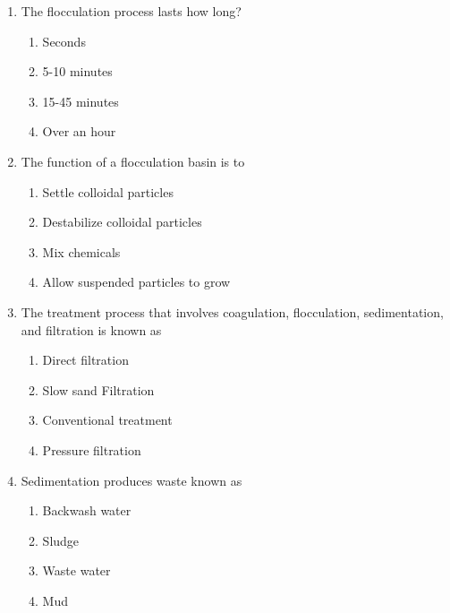 \begin{enumerate}
\item  The flocculation process lasts how long?\\
\begin{enumerate}
\item Seconds\\
\item 5-10 minutes\\
\item 15-45 minutes\\
\item Over an hour
\end{enumerate}

\item  The function of a flocculation basin is to\\
\begin{enumerate}
\item Settle colloidal particles\\
\item Destabilize colloidal particles\\
\item Mix chemicals\\
\item Allow suspended particles to grow
\end{enumerate}

\item The treatment process that involves coagulation, flocculation, sedimentation, and filtration is known as\\
\begin{enumerate}
\item Direct filtration\\
\item Slow sand Filtration\\
\item Conventional treatment\\
\item Pressure filtration
\end{enumerate}

\item  Sedimentation produces waste known as\\
\begin{enumerate}
\item Backwash water\\
\item Sludge\\
\item Waste water\\
\item Mud
\end{enumerate}


\end{enumerate}
